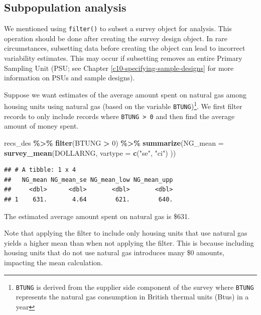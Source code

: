 \documentclass[
]{krantz}
\makeatletter
\newenvironment{Shaded}{\begin{snugshade}}{\end{snugshade}}
\newcommand{\AttributeTok}[1]{\textcolor[rgb]{0.27,0.27,0.27}{#1}}
\newcommand{\DecValTok}[1]{\textcolor[rgb]{0.06,0.06,0.06}{#1}}
\newcommand{\FunctionTok}[1]{\textcolor[rgb]{0.27,0.27,0.27}{\textbf{#1}}}
\newcommand{\NormalTok}[1]{#1}
\newcommand{\SpecialCharTok}[1]{\textcolor[rgb]{0.43,0.43,0.43}{\textbf{#1}}}
\newcommand{\StringTok}[1]{\textcolor[rgb]{0.5,0.5,0.5}{#1}}
\newenvironment{kframe}{%
\medskip{}
\setlength{\fboxsep}{.8em}
 \def\at@end@of@kframe{}%
 \ifinner\ifhmode%
  \def\at@end@of@kframe{\end{minipage}}%
  \begin{minipage}{\columnwidth}%
 \fi\fi%
 \def\FrameCommand##1{\hskip\@totalleftmargin \hskip-\fboxsep
 \colorbox{shadecolor}{##1}\hskip-\fboxsep
     \hskip-\linewidth \hskip-\@totalleftmargin \hskip\columnwidth}%
 \MakeFramed {\advance\hsize-\width
   \@totalleftmargin\z@ \linewidth\hsize
   \@setminipage}}%
 {\par\unskip\endMakeFramed%
 \at@end@of@kframe}
\renewenvironment{Shaded}{\begin{kframe}}{\end{kframe}}
\makeatother
\begin{document}
\hypertarget{subpopulation-analysis}{%
\subsection{Subpopulation analysis}\label{subpopulation-analysis}}

We mentioned using \texttt{filter()} to subset a survey object for analysis. This operation should be done after creating the survey design object. In rare circumstances, subsetting data before creating the object can lead to incorrect variability estimates. This may occur if subsetting removes an entire Primary Sampling Unit (PSU; see Chapter \ref{c10-specifying-sample-designs} for more information on PSUs and sample designs).

Suppose we want estimates of the average amount spent on natural gas among housing units using natural gas (based on the variable \texttt{BTUNG})\footnote{\texttt{BTUNG} is derived from the supplier side component of the survey where \texttt{BTUNG} represents the natural gas consumption in British thermal units (Btus) in a year}. We first filter records to only include records where \texttt{BTUNG\ \textgreater{}\ 0} and then find the average amount of money spent.

\begin{Shaded}
\begin{Highlighting}[]
\NormalTok{recs\_des }\SpecialCharTok{\%\textgreater{}\%}
  \FunctionTok{filter}\NormalTok{(BTUNG }\SpecialCharTok{\textgreater{}} \DecValTok{0}\NormalTok{) }\SpecialCharTok{\%\textgreater{}\%}
  \FunctionTok{summarize}\NormalTok{(}\AttributeTok{NG\_mean =} \FunctionTok{survey\_mean}\NormalTok{(DOLLARNG,}
    \AttributeTok{vartype =} \FunctionTok{c}\NormalTok{(}\StringTok{"se"}\NormalTok{, }\StringTok{"ci"}\NormalTok{)}
\NormalTok{  ))}
\end{Highlighting}
\end{Shaded}

\begin{verbatim}
## # A tibble: 1 x 4
##   NG_mean NG_mean_se NG_mean_low NG_mean_upp
##     <dbl>      <dbl>       <dbl>       <dbl>
## 1    631.       4.64        621.        640.
\end{verbatim}

The estimated average amount spent on natural gas is \$631.

Note that applying the filter to include only housing units that use natural gas yields a higher mean than when not applying the filter. This is because including housing units that do not use natural gas introduces many \$0 amounts, impacting the mean calculation.
\end{document}

